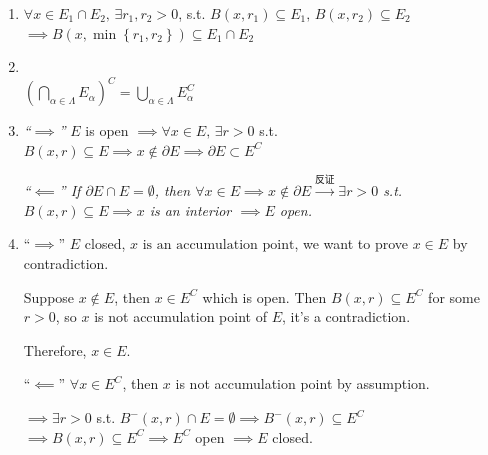 \begin{pf}
    \begin{enumerate}
        \item $\forall x\in E_1\cap E_2,\,\exists r_1,r_2>0$, s.t. $B(x,r_1)\subseteq E_1,\,B(x,r_2)\subseteq E_2$\\
              $\implies B\left(x,\min\left\{r_1,r_2\right\}\right)\subseteq E_1\cap E_2$
        \item {}\\
              $\left(\bigcap_{\alpha\in\Lambda}E_\alpha\right)^C=\bigcup_{\alpha\in\Lambda}E_\alpha^C$

        \item \emph{``$\implies$''} $E$ is open $\implies\forall x\in E,\,\exists r>0$ s.t. $B(x,r)\subseteq E\implies x\not\in\partial E\implies\partial E\subset E^C$

              \emph{``$\impliedby$'' If $\partial E\cap E=\emptyset$, then $\forall x\in E\implies x\not\in\partial E\xrightarrow{\text{反证}}\exists r>0$ s.t. $B(x,r)\subseteq E\implies x$ is an interior $\implies E$ open.}

              \setcounter{enumi}{4}

        \item ``$\implies$'' $E$ closed, $\boxed{x\text{ is an accumulation point}}$, we want to prove $x\in E$ by contradiction.

              Suppose $x\not\in E$, then $x\in E^C$ which is open. Then $B(x,r)\subseteq E^C$ for some $r>0$, so $x$ is not accumulation point of $E$, it's a contradiction.

              Therefore, $x\in E$.

              ``$\impliedby$'' $\forall x\in E^C$, then $x$ is not accumulation point by assumption.

              $\implies\exists r>0$ s.t. $B^-(x,r)\cap E=\emptyset\implies B^-(x,r)\subseteq E^C$\\
              $\implies B(x,r)\subseteq E^C\implies E^C$ open $\implies E$ closed.
    \end{enumerate}
\end{pf}

